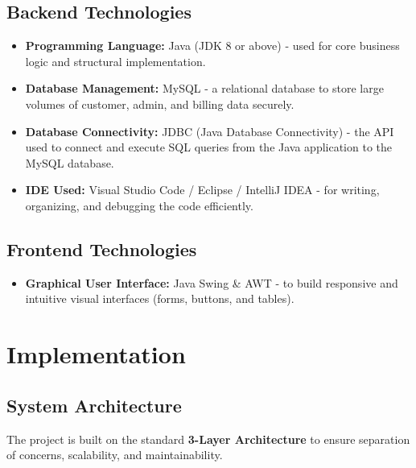 \documentclass[a4paper,12pt]{article}
\begin{document}
\subsection{Backend Technologies}
\begin{itemize}
    \item \textbf{Programming Language:} Java (JDK 8 or above) - used for core business logic and structural implementation.
    \item \textbf{Database Management:} MySQL - a relational database to store large volumes of customer, admin, and billing data securely.
    \item \textbf{Database Connectivity:} JDBC (Java Database Connectivity) - the API used to connect and execute SQL queries from the Java application to the MySQL database.
    \item \textbf{IDE Used:} Visual Studio Code / Eclipse / IntelliJ IDEA - for writing, organizing, and debugging the code efficiently.
\end{itemize}

\subsection{Frontend Technologies}
\begin{itemize}
    \item \textbf{Graphical User Interface:} Java Swing \& AWT - to build responsive and intuitive visual interfaces (forms, buttons, and tables).
\end{itemize}


\section{Implementation}

\subsection{System Architecture}
The project is built on the standard \textbf{3-Layer Architecture} to ensure separation of concerns, scalability, and maintainability.
\end{document}
